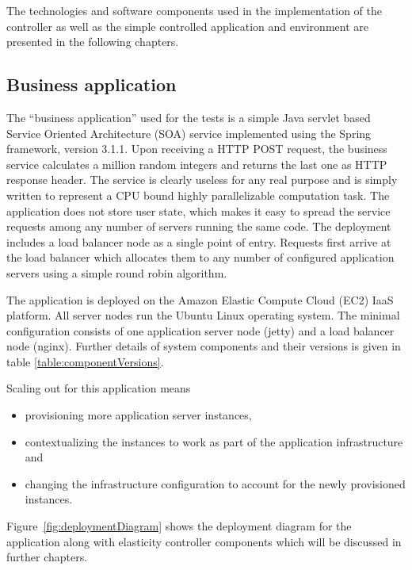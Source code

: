 \documentclass[english]{tktltiki2}
\theoremstyle{definition}
\theoremstyle{remark}
\begin{document}
The technologies and software components used in the implementation of the
controller as well as the simple controlled application and environment are
presented in the following chapters.

\subsection{Business application}

The ``business application'' used for the tests is a simple Java servlet based
Service Oriented Architecture (SOA) service implemented using the Spring
framework, version 3.1.1. Upon receiving a HTTP POST request, the business
service calculates a million random integers and returns the last one as HTTP
response header. The service is clearly useless for any real purpose and is
simply written to represent a CPU bound highly parallelizable computation task.
The application does not store user state, which makes it easy to spread the
service requests among any number of servers running the same code. The
deployment includes a load balancer node as a single point of entry. Requests
first arrive at the load balancer which allocates them to any number of
configured application servers using a simple round robin algorithm.

The application is deployed on the Amazon Elastic Compute Cloud (EC2) IaaS
platform. All server nodes run the Ubuntu Linux operating system. The minimal
configuration consists of one application server node (jetty) and a load
balancer node (nginx). Further details of system components and their versions
is given in table \ref{table:componentVersions}.

Scaling out for this application means  

\begin{itemize}
	\item{provisioning more application server instances,}
	\item{contextualizing the instances to work as part of the application 
	infrastructure and}
	\item{changing the infrastructure configuration to account for the newly 
	provisioned instances.}
\end{itemize}

Figure~\ref{fig:deploymentDiagram} shows the deployment diagram for the
application along with elasticity controller components which will be discussed
in further chapters.
\end{document}
